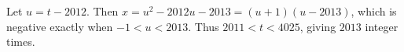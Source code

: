 Let $u=t-2012$. Then $x=u^2-2012u-2013=(u+1)(u-2013)$, which is negative exactly when $-1<u<2013$. Thus $2011<t<4025$, giving $\boxed{2013}$ integer times.

